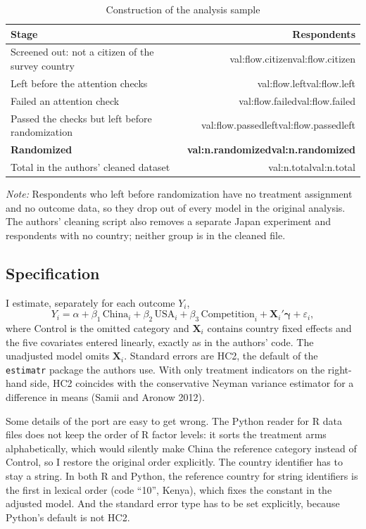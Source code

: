 \documentclass[11pt]{article}
\newcommand{\tablenote}[1]{\par\vspace{4pt}\begin{minipage}{\linewidth}\footnotesize #1\end{minipage}}
\newcommand{\val}[1]{\ifcsname val:#1\endcsname\else\errmessage{Undefined value: #1}\fi\csname val:#1\endcsname}
\begin{document}
\begin{table}[ht]
\centering
\caption{Construction of the analysis sample}
\label{tab:flow}
\begin{tabular}{lr}
\toprule
Stage & Respondents \\
\midrule
Screened out: not a citizen of the survey country & \val{flow.citizen} \\
Left before the attention checks & \val{flow.left} \\
Failed an attention check & \val{flow.failed} \\
Passed the checks but left before randomization & \val{flow.passedleft} \\
\textbf{Randomized} & \textbf{\val{n.randomized}} \\
\midrule
Total in the authors' cleaned dataset & \val{n.total} \\
\bottomrule
\end{tabular}
\tablenote{\emph{Note:} Respondents who left before randomization have no treatment assignment and no outcome data, so they drop out of every model in the original analysis. The authors' cleaning script also removes a separate Japan experiment and respondents with no country; neither group is in the cleaned file.}
\end{table}

\subsection{Specification}

I estimate, separately for each outcome $Y_i$,
\begin{equation}
Y_i = \alpha + \beta_1\,\text{China}_i + \beta_2\,\text{USA}_i + \beta_3\,\text{Competition}_i + \mathbf{X}_i'\boldsymbol{\gamma} + \varepsilon_i,
\label{eq:main}
\end{equation}
where Control is the omitted category and $\mathbf{X}_i$ contains country fixed effects and the five covariates entered linearly, exactly as in the authors' code. The unadjusted model omits $\mathbf{X}_i$. Standard errors are HC2, the default of the \texttt{estimatr} package the authors use. With only treatment indicators on the right-hand side, HC2 coincides with the conservative Neyman variance estimator for a difference in means (Samii and Aronow 2012).

Some details of the port are easy to get wrong. The Python reader for R data files does not keep the order of R factor levels: it sorts the treatment arms alphabetically, which would silently make China the reference category instead of Control, so I restore the original order explicitly. The country identifier has to stay a string. In both R and Python, the reference country for string identifiers is the first in lexical order (code ``10'', Kenya), which fixes the constant in the adjusted model. And the standard error type has to be set explicitly, because Python's default is not HC2.
\end{document}
